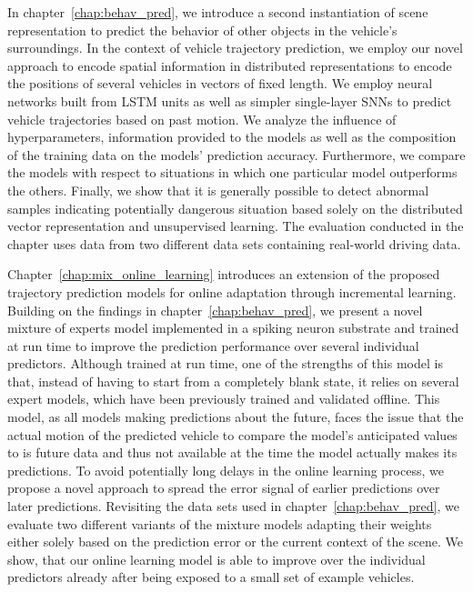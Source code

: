 In chapter~\ref{chap:behav_pred}, we introduce a second instantiation of scene representation to predict the behavior of other objects in the vehicle's surroundings.
In the context of vehicle trajectory prediction, we employ our novel approach to encode spatial information in distributed representations to encode the positions of several vehicles in vectors of fixed length.
We employ neural networks built from \ac{LSTM} units as well as simpler single-layer \acp{SNN} to predict vehicle trajectories based on past motion.
We analyze the influence of hyperparameters, information provided to the models as well as the composition of the training data on the models' prediction accuracy.
Furthermore, we compare the models with respect to situations in which one particular model outperforms the others.
Finally, we show that it is generally possible to detect abnormal samples indicating potentially dangerous situation based solely on the distributed vector representation and unsupervised learning.
The evaluation conducted in the chapter uses data from two different data sets containing real-world driving data.

Chapter~\ref{chap:mix_online_learning} introduces an extension of the proposed trajectory prediction models for online adaptation through incremental learning.
Building on the findings in chapter~\ref{chap:behav_pred}, we present a novel mixture of experts model implemented in a spiking neuron substrate and trained at run time to improve the prediction performance over several individual predictors.
Although trained at run time, one of the strengths of this model is that, instead of having to start from a completely blank state, it relies on several expert models, which have been previously trained and validated offline.
This model, as all models making predictions about the future, faces the issue that the actual motion of the predicted vehicle to compare the model's anticipated values to is future data and thus not available at the time the model actually makes its predictions.
To avoid potentially long delays in the online learning process, we propose a novel approach to spread the error signal of earlier predictions over later predictions.
Revisiting the data sets used in chapter~\ref{chap:behav_pred}, we evaluate two different variants of the mixture models adapting their weights either solely based on the prediction error or the current context of the scene.
We show, that our online learning model is able to improve over the individual predictors already after being exposed to a small set of example vehicles.

